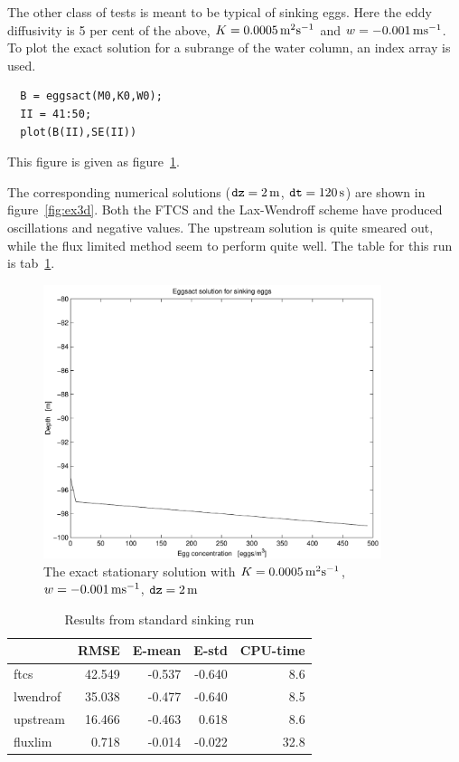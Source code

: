 The other class of tests is meant to be typical of sinking eggs.
Here the eddy diffusivity is 5 per cent of the above,
$K = 0.0005 \, \mbox{m}^2 \mbox{s}^{-1}$ and $w = -0.001 \, \mbox{m} \mbox{s}^{-1}$. 
To plot the exact solution
for a subrange of the water column, an index array is used.
\begin{verbatim}
  B = eggsact(M0,K0,W0);
  II = 41:50;  
  plot(B(II),SE(II))
\end{verbatim}
This figure is given as figure~\ref{fig:ex3c}.

The corresponding numerical solutions (${\mbox{\texttt{dz}}} = 2 \, \mbox{m}$, ${\mbox{\texttt{dt}}} =
120 \, \mbox{s}$) are shown in figure~\ref{fig:ex3d}. Both the FTCS and the
Lax-Wendroff scheme have produced oscillations and negative values.
The upstream solution is quite smeared out, while the flux limited
method seem to perform quite well. The table for this run is
tab~\ref{tab:ex3sinc}.


\begin{figure}
\begin{center}
\includegraphics[height=8cm]{ex3c}
\end{center}
\caption{The exact stationary solution with%
     $K = 0.0005 \, \mbox{m}^2 \mbox{s}^{-1}$, $w = -0.001 \, \mbox{m} \mbox{s}^{-1}$,%
     ${\mbox{\texttt{dz}}} = 2 \, \mbox{m}$}\label{fig:ex3c}
\end{figure}

\begin{table}[h]
\begin{center}
\begin{tabular}{||l|r|r|r|r||}
\hline
    &  RMSE  & E-mean & E-std & CPU-time \\
\hline
ftcs     & 42.549 & -0.537 & -0.640 &  8.6  \\
lwendrof & 35.038 & -0.477 & -0.640 &  8.5  \\
upstream & 16.466 & -0.463 &  0.618 &  8.6  \\
fluxlim  &  0.718 & -0.014 & -0.022 & 32.8  \\
\hline
\end{tabular}
\end{center}
\caption{Results from standard sinking run}\label{tab:ex3sinc}
\end{table}

